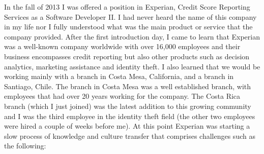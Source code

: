 \documentclass[12pt, letterpaper]{article}
\begin{document}
In the fall of 2013 I was offered a position in Experian, Credit Score Reporting Services as a Software Developer II.
I had never heard the name of this company in my life nor I fully understood what was the main product or service that 
the company provided. 
After the first introduction day, I came to learn that Experian was a well-known company worldwide with over 16,000
employees and their business encompasses credit reporting but also other products such as decision 
analytics, marketing assistance and identity theft. I also learned that we would be working mainly with a branch in 
Costa Mesa, California, and a branch in Santiago, Chile. The branch in Costa Mesa was a well established branch, with 
employees that had over 20 years working for the company. The Costa Rica branch (which I just joined) was the latest addition to this growing 
community and I was the third employee in the identity theft field (the other two employees were hired a couple of 
weeks before me). At this point Experian was starting a slow process of knowledge and culture transfer that comprises 
challenges such as the following:
\end{document}
